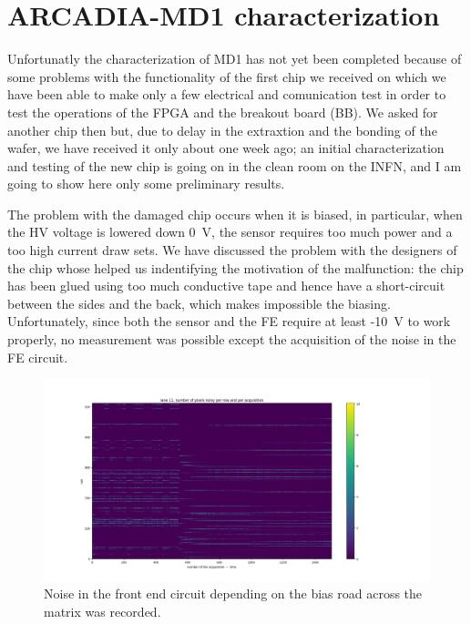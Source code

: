 \section{ARCADIA-MD1 characterization}
    Unfortunatly the characterization of MD1 has not yet been completed because of some problems with the functionality of the first chip we received on which we have been able to make only a few electrical and comunication test in order to test the operations of the FPGA and the breakout board (BB).
    We asked for another chip then but, due to delay in the extraxtion and the bonding of the wafer, we have received it only about one week ago; an initial characterization and testing of the new chip is going on in the clean room on the INFN, and I am going to show here only some preliminary results. 
    
    The problem with the damaged chip occurs when it is biased, in particular, when the HV voltage is lowered down \SI{0}{V}, the sensor requires too much power and a too high current draw sets. We have discussed the problem with the designers of the chip whose helped us indentifying the motivation of the malfunction: the chip has been glued using too much conductive tape and hence have a short-circuit between the sides and the back, which makes impossible the biasing.     
    Unfortunately, since both the sensor and the FE require at least -\SI{10}{V} to work properly, no measurement was possible except the acquisition of the noise in the FE circuit. 
    \begin{figure}[h!]
        \centering
        \includegraphics[width=.95\linewidth]{figures/charaterization/ARCADIA/pixel_per_row_per_acq_11_60.png}
        \caption{Noise in the front end circuit depending on the bias road across the matrix was recorded. }
        \label{fig:ARCADIA_noise}
    \end{figure}

